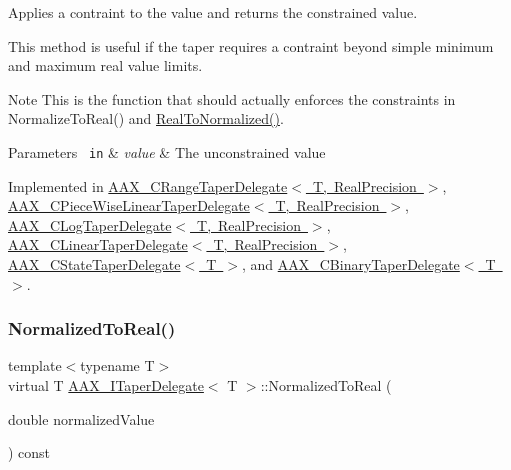 Applies a contraint to the value and returns the constrained value. 

This method is useful if the taper requires a contraint beyond simple minimum and maximum real value limits.

\begin{DoxyNote}{Note}
This is the function that should actually enforces the constraints in Normalize\+To\+Real() and \mbox{\hyperlink{a01881_ab017fe7e1c1dcf6191f8b4e8b09f8add}{Real\+To\+Normalized()}}.
\end{DoxyNote}

\begin{DoxyParams}[1]{Parameters}
\mbox{\texttt{ in}}  & {\em value} & The unconstrained value \\
\hline
\end{DoxyParams}


Implemented in \mbox{\hyperlink{a01557_aecea5b86d9f5c6a5b1af87ba04d8473d}{A\+A\+X\+\_\+\+C\+Range\+Taper\+Delegate$<$ T, Real\+Precision $>$}}, \mbox{\hyperlink{a01553_ac9d5c430c625bb3e9720d009a1b9d779}{A\+A\+X\+\_\+\+C\+Piece\+Wise\+Linear\+Taper\+Delegate$<$ T, Real\+Precision $>$}}, \mbox{\hyperlink{a01497_ae0c5ef04b9f6e62cff0d73fb9aad7318}{A\+A\+X\+\_\+\+C\+Log\+Taper\+Delegate$<$ T, Real\+Precision $>$}}, \mbox{\hyperlink{a01493_aad9ea52c4f3c4cae45b6d5309c2833de}{A\+A\+X\+\_\+\+C\+Linear\+Taper\+Delegate$<$ T, Real\+Precision $>$}}, \mbox{\hyperlink{a01569_a6caec4112e24a711c9b7fdefa6384462}{A\+A\+X\+\_\+\+C\+State\+Taper\+Delegate$<$ T $>$}}, and \mbox{\hyperlink{a01457_a91622c9c4cfaaf3b08e39095a26d182a}{A\+A\+X\+\_\+\+C\+Binary\+Taper\+Delegate$<$ T $>$}}.

\mbox{\label{a01881_a0aea0765b42855205bfab84673a2de33}} 
\subsubsection{\texorpdfstring{NormalizedToReal()}{NormalizedToReal()}}
{\footnotesize\ttfamily template$<$typename T$>$ \\
virtual T \mbox{\hyperlink{a01881}{A\+A\+X\+\_\+\+I\+Taper\+Delegate}}$<$ T $>$\+::Normalized\+To\+Real (\begin{DoxyParamCaption}\item[{double}]{normalized\+Value }\end{DoxyParamCaption}) const\hspace{0.3cm}{\ttfamily [pure virtual]}}



